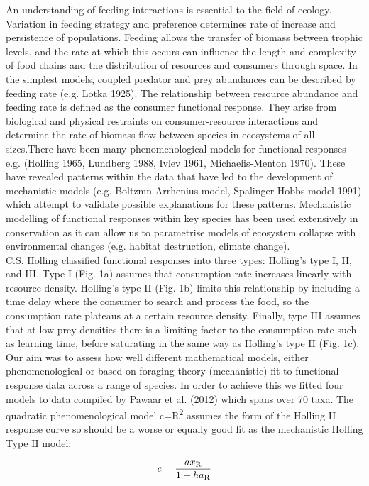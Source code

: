 \documentclass[11pt]{article}
\begin{document}
	An understanding of feeding interactions is essential to the field of ecology. Variation in feeding strategy and preference determines rate of increase and persistence of populations. Feeding allows the transfer of biomass between trophic levels, and the rate at which this occurs can influence the length and complexity of food chains and the distribution of resources and consumers through space. In the simplest models, coupled predator and prey abundances can be described by feeding rate (e.g. Lotka 1925). The relationship between resource abundance and feeding rate is defined as the consumer functional response. They arise from biological and physical restraints on consumer-resource interactions and determine the rate of biomass flow between species in ecosystems of all sizes.There have been many phenomenological models for functional responses e.g. (Holling 1965, Lundberg 1988, Ivlev 1961,  Michaelis-Menton 1970). These have revealed patterns within the data that have led to the development of mechanistic models (e.g. Boltzmn-Arrhenius model, Spalinger-Hobbs model 1991) which attempt to validate possible explanations for these patterns. Mechanistic modelling of functional responses within key species has been used extensively in conservation as it can allow us to parametrise models of ecosystem collapse with environmental changes (e.g. habitat destruction, climate change).\\
	
	C.S. Holling classified functional responses into three types: Holling's type I, II, and III. Type I (Fig. 1a) assumes that consumption rate increases linearly with resource density. Holling's type II (Fig. 1b) limits this relationship by including a time delay where the consumer to  search and process the food, so the consumption rate plateaus at a certain resource density. Finally, type III assumes that at low prey densities there is a limiting factor to the consumption rate such as learning time, before saturating in the same way as Holling's type II (Fig. 1c). Our aim was to assess how well different mathematical models, either phenomenological or based on foraging theory (mechanistic) fit to functional response data across a range of species. In order to achieve this we fitted four models to data compiled by Pawaar et al. (2012) which spans over 70 taxa. The quadratic phenomenological model c=R\textsuperscript{2}
	assumes the form of the Holling II response curve so should be a worse or equally good fit as the mechanistic Holling Type II model: 
	
	$$c=\frac{ax\textsubscript{R}}{1+ha\textsubscript{R}}$$
	
\end{document}
